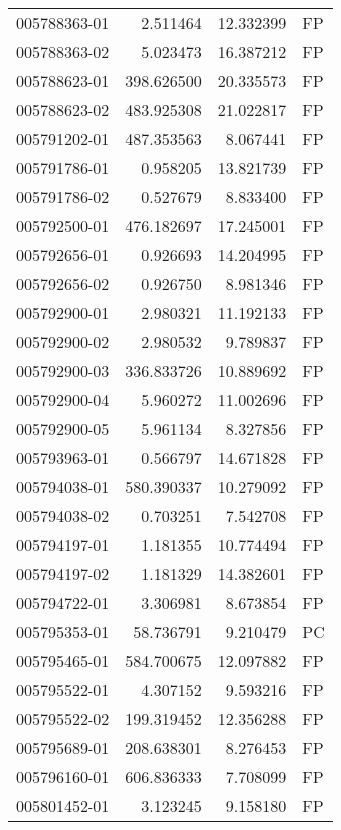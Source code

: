 \begin{tabular}{lrrl}
005788363-01 &    2.511464 &      12.332399 &   FP \\
005788363-02 &    5.023473 &      16.387212 &   FP \\
005788623-01 &  398.626500 &      20.335573 &   FP \\
005788623-02 &  483.925308 &      21.022817 &   FP \\
005791202-01 &  487.353563 &       8.067441 &   FP \\
005791786-01 &    0.958205 &      13.821739 &   FP \\
005791786-02 &    0.527679 &       8.833400 &   FP \\
005792500-01 &  476.182697 &      17.245001 &   FP \\
005792656-01 &    0.926693 &      14.204995 &   FP \\
005792656-02 &    0.926750 &       8.981346 &   FP \\
005792900-01 &    2.980321 &      11.192133 &   FP \\
005792900-02 &    2.980532 &       9.789837 &   FP \\
005792900-03 &  336.833726 &      10.889692 &   FP \\
005792900-04 &    5.960272 &      11.002696 &   FP \\
005792900-05 &    5.961134 &       8.327856 &   FP \\
005793963-01 &    0.566797 &      14.671828 &   FP \\
005794038-01 &  580.390337 &      10.279092 &   FP \\
005794038-02 &    0.703251 &       7.542708 &   FP \\
005794197-01 &    1.181355 &      10.774494 &   FP \\
005794197-02 &    1.181329 &      14.382601 &   FP \\
005794722-01 &    3.306981 &       8.673854 &   FP \\
005795353-01 &   58.736791 &       9.210479 &   PC \\
005795465-01 &  584.700675 &      12.097882 &   FP \\
005795522-01 &    4.307152 &       9.593216 &   FP \\
005795522-02 &  199.319452 &      12.356288 &   FP \\
005795689-01 &  208.638301 &       8.276453 &   FP \\
005796160-01 &  606.836333 &       7.708099 &   FP \\
005801452-01 &    3.123245 &       9.158180 &   FP \\

\end{tabular}
